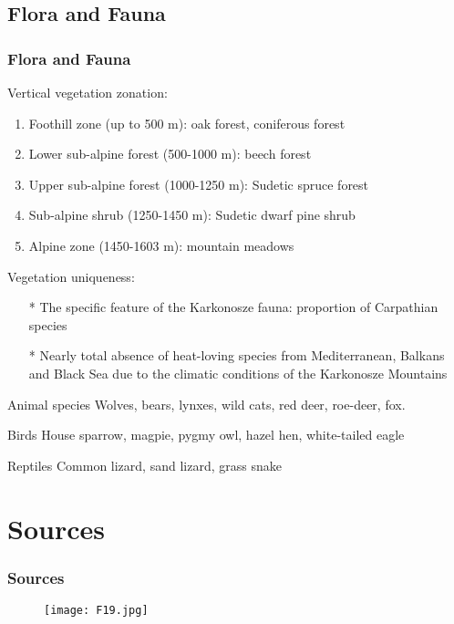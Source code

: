 \documentclass[pdflatex,compress,8pt,
	xcolor={dvipsnames,dvipsnames,svgnames,x11names,table},
	hyperref={colorlinks = true,
	breaklinks = true, urlcolor = NavyBlue, breaklinks = true}]{beamer}
\begin{document}
\subsection{Flora and Fauna}
\begin{frame}\frametitle{Flora and Fauna}
\vspace{3em}
Vertical vegetation zonation:
\begin{enumerate}
	\item Foothill zone (up to 500 m): oak forest, coniferous forest 
	\item Lower sub-alpine forest (500-1000 m): beech forest
	\item Upper sub-alpine forest (1000-1250 m): Sudetic spruce forest 
	\item Sub-alpine shrub (1250-1450 m): Sudetic dwarf pine shrub
	\item Alpine zone (1450-1603 m): mountain meadows
\end{enumerate}

Vegetation uniqueness:
\begin{itemize}
	\item [*]The specific feature of the Karkonosze fauna: proportion of Carpathian species
	\item [*]Nearly total absence of heat-loving species from Mediterranean, Balkans and Black Sea due to the climatic conditions of the Karkonosze Mountains
\end{itemize}

\begin{alertblock}{Animal species}
Wolves, bears, lynxes, wild cats, red deer, roe-deer, fox.
\end{alertblock}

\begin{block}{Birds}
House sparrow, magpie, pygmy owl, hazel hen, white-tailed eagle
\end{block}

\begin{block}{Reptiles}
Common lizard, sand lizard, grass snake
\end{block}

\end{frame}

\section{Sources}
\begin{frame}\frametitle{Sources}
\begin{figure}[H]
	\centering
		\texttt{[image: F19.jpg]}
\end{figure}
\end{frame}
\end{document}
